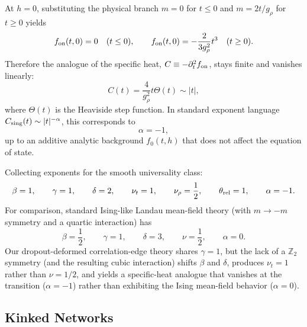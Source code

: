 \documentclass{article}
\theoremstyle{plain}
\theoremstyle{definition}
\theoremstyle{remark}
\begin{document}
At \(h=0\), substituting the physical branch
\(m=0\) for \(t\le 0\) and \(m=2t/g_\rho\) for \(t\ge 0\) yields
\relax
\begin{equation}
f_{\rm on}(t,0)=0 \quad (t\le 0), \qquad f_{\rm on}(t,0)=-\frac{2}{3g_\rho^{2}} t^{3}\quad (t\ge 0).
\end{equation}
\relax
Therefore the analogue of the specific heat, \(C\equiv -\partial_t^{2} f_{\rm on}\), stays finite and vanishes linearly:
\relax
\begin{equation}
C(t)=\frac{4}{g_\rho^{2}} t \Theta(t)\sim |t|,
\end{equation}
\relax
where $\Theta(t)$ is the Heaviside step function. In standard exponent language \(C_{\rm sing}(t)\sim |t|^{-\alpha}\), this corresponds to
\relax
\begin{equation}
\alpha=-1,
\end{equation}
\relax
up to an additive analytic background \(f_0(t,h)\) that does not affect the equation of state.

Collecting exponents for the smooth universality class:
\relax
\begin{equation}
\beta=1, \qquad \gamma=1, \qquad \delta=2, \qquad \nu_t=1, \qquad \nu_\rho=\frac{1}{2}, \qquad \theta_{\rm rel}=1, \qquad \alpha=-1.
\end{equation}
\relax
For comparison, standard Ising-like Landau mean-field theory (with \(m\to -m\) symmetry and a quartic interaction) has
\relax
\begin{equation}
\beta=\frac{1}{2}, \qquad \gamma=1, \qquad \delta=3, \qquad \nu=\frac{1}{2}, \qquad \alpha=0.
\end{equation}
\relax
Our dropout-deformed correlation-edge theory shares \(\gamma=1\), but the lack of a \(\mathbb Z_2\) symmetry (and the resulting cubic interaction)
shifts \(\beta\) and \(\delta\), produces \(\nu_t=1\) rather than \(\nu=1/2\), and yields a specific-heat analogue that vanishes at the transition (\(\alpha=-1\))
rather than exhibiting the Ising mean-field behavior (\(\alpha=0\)).










\subsection{Kinked Networks}
\label{sec:kinks}
\end{document}
